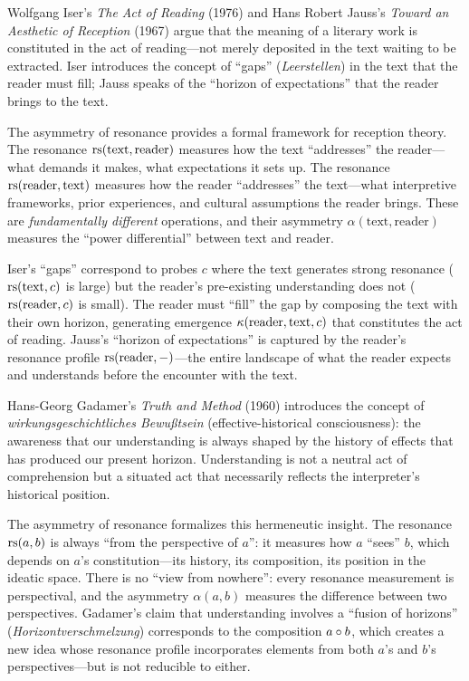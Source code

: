 \begin{interpretation}\label{interp:ch4:reception_theory}
Wolfgang Iser's \emph{The Act of Reading} (1976) and Hans Robert Jauss's
\emph{Toward an Aesthetic of Reception} (1967) argue that the meaning of a
literary work is constituted in the act of reading---not merely deposited
in the text waiting to be extracted. Iser introduces the concept of
``gaps'' (\emph{Leerstellen}) in the text that the reader must fill;
Jauss speaks of the ``horizon of expectations'' that the reader brings
to the text.

The asymmetry of resonance provides a formal framework for reception
theory. The resonance $\mathrm{rs}(\text{text}, \text{reader})$ measures how the
text ``addresses'' the reader---what demands it makes, what expectations
it sets up. The resonance $\mathrm{rs}(\text{reader}, \text{text})$ measures how
the reader ``addresses'' the text---what interpretive frameworks, prior
experiences, and cultural assumptions the reader brings. These are
\emph{fundamentally different} operations, and their asymmetry
$\alpha(\text{text}, \text{reader})$ measures the ``power differential''
between text and reader.

Iser's ``gaps'' correspond to probes $c$ where the text generates strong
resonance ($\mathrm{rs}(\text{text}, c)$ is large) but the reader's pre-existing
understanding does not ($\mathrm{rs}(\text{reader}, c)$ is small). The reader
must ``fill'' the gap by composing the text with their own horizon,
generating emergence $\kappa(\text{reader}, \text{text}, c)$ that
constitutes the act of reading. Jauss's ``horizon of expectations'' is
captured by the reader's resonance profile $\mathrm{rs}(\text{reader}, -)$---the
entire landscape of what the reader expects and understands before the
encounter with the text.
\end{interpretation}

\begin{interpretation}\label{interp:ch4:gadamer_consciousness}
Hans-Georg Gadamer's \emph{Truth and Method} (1960) introduces the concept
of \emph{wirkungsgeschichtliches Bewu\ss tsein} (effective-historical
consciousness): the awareness that our understanding is always shaped by
the history of effects that has produced our present horizon. Understanding
is not a neutral act of comprehension but a situated act that necessarily
reflects the interpreter's historical position.

The asymmetry of resonance formalizes this hermeneutic insight.
The resonance $\mathrm{rs}(a, b)$ is always ``from the perspective of $a$'': it
measures how $a$ ``sees'' $b$, which depends on $a$'s constitution---its
history, its composition, its position in the ideatic space. There is no
``view from nowhere'': every resonance measurement is perspectival, and
the asymmetry $\alpha(a, b)$ measures the difference between two
perspectives. Gadamer's claim that understanding involves a ``fusion of
horizons'' (\emph{Horizontverschmelzung}) corresponds to the composition
$a \circ b$, which creates a new idea whose resonance profile
incorporates elements from both $a$'s and $b$'s perspectives---but is
not reducible to either.
\end{interpretation}

